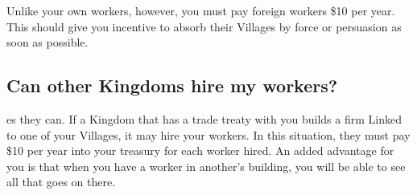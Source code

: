 Unlike your own workers, however, you must pay foreign workers \$10 per year. This should give you incentive to absorb their Villages by force or persuasion as soon as possible.

\subsection{\textsf{Can other Kingdoms hire my workers?}}

es they can. If a Kingdom that has a trade treaty with you builds a firm Linked to one of your Villages, it may hire your workers. In this situation, they must pay \$10 per year into your treasury for each worker hired. An added advantage for you is that when you have a worker in another’s building, you will be able to see all that goes on there.